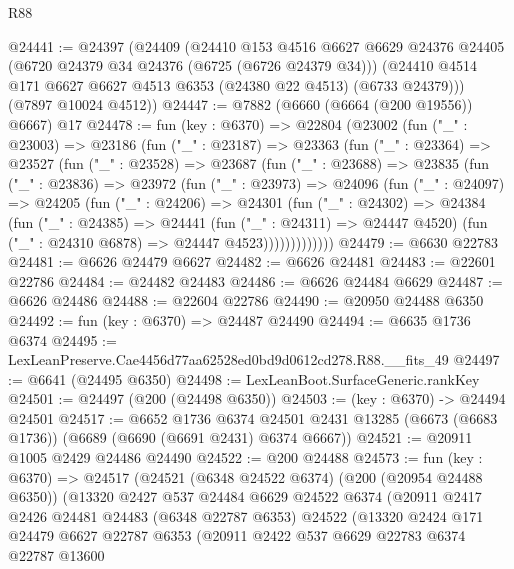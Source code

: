 \begin{lexlean}{R88}
\begin{coremodule}
@24441 := @24397
    (@24409
      (@24410
        @153
        @4516
        @6627
        @6629
        @24376
        @24405
        (@6720 @24379 @34 @24376 (@6725 (@6726 @24379 @34)))
        (@24410 @4514 @171 @6627 @6627 @4513 @6353 (@24380 @22 @4513) (@6733 @24379)))
      (@7897 @10024 @4512))
@24447 := @7882 (@6660 (@6664 (@200 @19556)) @6667) @17
@24478 := fun (key : @6370) =>
  @22804
    (@23002
      (fun ("_" : @23003) =>
      @23186
        (fun ("_" : @23187) =>
        @23363
          (fun ("_" : @23364) =>
          @23527
            (fun ("_" : @23528) =>
            @23687
              (fun ("_" : @23688) =>
              @23835
                (fun ("_" : @23836) =>
                @23972
                  (fun ("_" : @23973) =>
                  @24096
                    (fun ("_" : @24097) =>
                    @24205
                      (fun ("_" : @24206) =>
                      @24301
                        (fun ("_" : @24302) =>
                        @24384
                          (fun ("_" : @24385) =>
                          @24441
                            (fun ("_" : @24311) => @24447 @4520)
                            (fun ("_" : @24310 @6878) => @24447 @4523)))))))))))))
@24479 := @6630 @22783
@24481 := @6626 @24479 @6627
@24482 := @6626 @24481
@24483 := @22601 @22786
@24484 := @24482 @24483
@24486 := @6626 @24484 @6629
@24487 := @6626 @24486
@24488 := @22604 @22786
@24490 := @20950 @24488 @6350
@24492 := fun (key : @6370) => @24487 @24490
@24494 := @6635 @1736 @6374
@24495 := LexLeanPreserve.Cae4456d77aa62528ed0bd9d0612cd278.R88.__fits_49
@24497 := @6641 (@24495 @6350)
@24498 := LexLeanBoot.SurfaceGeneric.rankKey
@24501 := @24497 (@200 (@24498 @6350))
@24503 := (key : @6370) -> @24494 @24501
@24517 := @6652
    @1736
    @6374
    @24501
    @2431
    @13285
    (@6673 (@6683 @1736))
    (@6689 (@6690 (@6691 @2431) @6374 @6667))
@24521 := @20911 @1005 @2429 @24486 @24490
@24522 := @200 @24488
@24573 := fun (key : @6370) =>
  @24517
    (@24521
      (@6348 @24522 @6374)
      (@200 (@20954 @24488 @6350))
      (@13320
        @2427
        @537
        @24484
        @6629
        @24522
        @6374
        (@20911
          @2417
          @2426
          @24481
          @24483
          (@6348 @22787 @6353)
          @24522
          (@13320
            @2424
            @171
            @24479
            @6627
            @22787
            @6353
            (@20911
              @2422
              @537
              @6629
              @22783
              @6374
              @22787
              @13600

\end{coremodule}
\end{lexlean}
